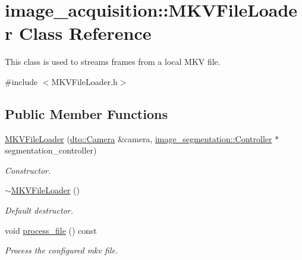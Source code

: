 \hypertarget{classimage__acquisition_1_1_m_k_v_file_loader}{}\section{image\+\_\+acquisition\+:\+:M\+K\+V\+File\+Loader Class Reference}
\label{classimage__acquisition_1_1_m_k_v_file_loader}


This class is used to streams frames from a local M\+KV file.  




{\ttfamily \#include $<$M\+K\+V\+File\+Loader.\+h$>$}

\subsection*{Public Member Functions}
\begin{DoxyCompactItemize}
\item 
\mbox{\label{classimage__acquisition_1_1_m_k_v_file_loader_abfacf6f9e96f0d884e9c2f8e40d67205}} 
\mbox{\hyperlink{classimage__acquisition_1_1_m_k_v_file_loader_abfacf6f9e96f0d884e9c2f8e40d67205}{M\+K\+V\+File\+Loader}} (\mbox{\hyperlink{structdto_1_1_camera}{dto\+::\+Camera}} \&camera, \mbox{\hyperlink{classimage__segmentation_1_1_controller}{image\+\_\+segmentation\+::\+Controller}} $\ast$segmentation\+\_\+controller)
\begin{DoxyCompactList}\small\item\em Constructor. \end{DoxyCompactList}\item 
\mbox{\label{classimage__acquisition_1_1_m_k_v_file_loader_aba454165b9571650e1e404f6ddb79492}} 
\mbox{\hyperlink{classimage__acquisition_1_1_m_k_v_file_loader_aba454165b9571650e1e404f6ddb79492}{$\sim$\+M\+K\+V\+File\+Loader}} ()
\begin{DoxyCompactList}\small\item\em Default destructor. \end{DoxyCompactList}\item 
\mbox{\label{classimage__acquisition_1_1_m_k_v_file_loader_a803cb4c353f40a6f97e5f2905e67c148}} 
void \mbox{\hyperlink{classimage__acquisition_1_1_m_k_v_file_loader_a803cb4c353f40a6f97e5f2905e67c148}{process\+\_\+file}} () const
\begin{DoxyCompactList}\small\item\em Process the configured mkv file. \end{DoxyCompactList}\end{DoxyCompactItemize}
